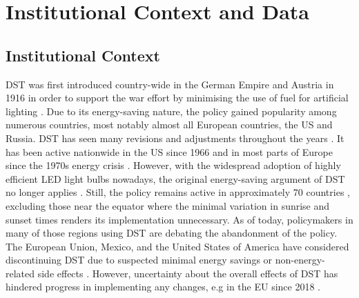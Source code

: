 \section{Institutional Context and Data}
\subsection{Institutional Context}
\ac{DST} was first introduced country-wide in the German Empire and Austria in 1916 in order to support the war effort by minimising the use of fuel for artificial lighting \parencite{Reichsgesetzblatt}. Due to its energy-saving nature, the policy gained popularity among numerous countries, most notably almost all European countries, the US and Russia. \ac{DST} has seen many revisions and adjustments throughout the years \parencite{prerau_book}. It has been active nationwide in the US since 1966 \parencite{Uniform} and in most parts of Europe since the 1970s energy crisis \parencite{pearce_great_2017}.  
However, with the widespread adoption of highly efficient LED light bulbs nowadays, the original energy-saving argument of \ac{DST} no longer applies \parencite{aries_effect_2008}.
Still, the policy remains active in approximately 70 countries \parencite{prerau_book}, excluding those near the equator where the minimal variation in sunrise and sunset times renders its implementation unnecessary. As of today, policymakers in many of those regions using \ac{DST} are debating the abandonment of the policy. The European Union, Mexico, and the United States of America have considered discontinuing DST due to suspected minimal energy savings or non-energy-related side effects \parencite{guven, mexico_congress, congress}. However, uncertainty about the overall effects of DST has hindered progress in implementing any changes, e.g in the EU since 2018 \parencite{eu_directive}.
\newline
